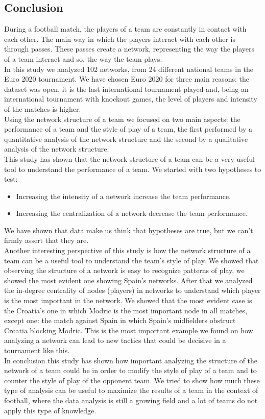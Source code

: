 \documentclass[12pt, a4paper]{article}
\begin{document}
\subsection{Conclusion}
\label{conclusion}
During a football match, the players of a team are constantly in contact with each other. The main way in which the players interact with each other is through passes. These passes create a network, representing the way the players of a team interact and so, the way the team plays.\\
In this study we analyzed 102 networks, from 24 different national teams in the Euro 2020 tournament. We have chosen Euro 2020 for three main reasons: the dataset was open, it is the last international tournament played and, being an international tournament with knockout games, the level of players and intensity of the matches is higher.\\
Using the network structure of a team we focused on two main aspects: the performance of a team and the style of play of a team, the first performed by a quantitative analysis of the network structure and the second by a qualitative analysis of the network structure.\\
This study has shown that the network structure of a team can be a very useful tool to understand the performance of a team. We started with two hypotheses to test:
\begin{itemize}
        \item Increasing the intensity of a network increase the team performance.
        \item Increasing the centralization of a network decrease the team performance. 
\end{itemize}
We have shown that data make us think that hypotheses are true, but we can't firmly assert that they are.\\
Another interesting perspective of this study is how the network structure of a team can be a useful tool to understand the team's style of play. We showed that observing the structure of a network is easy to recognize patterns of play, we showed the most evident one showing Spain's networks. After that we analyzed the in-degree centrality of nodes (players) in networks 
to understand which player is the most important in the network. We showed that the most evident case is the Croatia's one in which Modric is the most important node in all matches, except one: the match against Spain in which Spain's midfielders obstruct Croatia blocking Modric. This is the most important example we found on how analyzing a network can lead to new tactics that could be decisive in a tournament like this. \\
In conclusion this study has shown how important analyzing the structure of the network of a team could be in order to modify the style of play of a team and to counter the style of play of the opponent team. We tried to show how much these type of analysis can be useful to maximize the results of a team in the context of football, where the data analysis is still a growing field and a lot of teams do not apply this type of knowledge.\\
\end{document}
